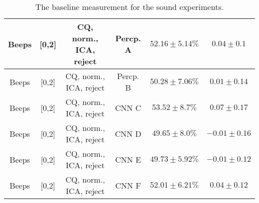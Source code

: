 \begin{table}[!htb]
{\begin{tabular}{c|c|c|c|c|c}
    \hline
    Beeps               & [0,2]                                         & CQ, norm., ICA, reject     & Percp. A              &  $52.16 \pm 5.14\%$   & $0.04 \pm 0.1$\\   
    \hline
    Beeps               & [0,2]                                         & CQ, norm., ICA, reject     & Percp. B              &  $50.28 \pm 7.06\%$   & $0.01 \pm 0.14$\\  
    \hline
    Beeps               & [0,2]                                         & CQ, norm., ICA, reject     & CNN C                 &  $53.52 \pm 8.7\%$    & $0.07 \pm 0.17$\\  
    \hline
    Beeps               & [0,2]                                         & CQ, norm., ICA, reject     & CNN D                 &  $49.65 \pm 8.0\%$    & $-0.01 \pm 0.16$\\  
    \hline
    Beeps               & [0,2]                                         & CQ, norm., ICA, reject     & CNN E                 &  $49.73 \pm 5.92\%$   & $-0.01 \pm 0.12$\\  
    \hline
    Beeps               & [0,2]                                         & CQ, norm., ICA, reject     & CNN F                 &  $52.01 \pm 6.21\%$   & $0.04 \pm 0.12$\\   
    \hline
\end{tabular}
}
\caption{The baseline measurement for the sound experiments.}
\label{tab:sound-baseline+reject-app}
\end{table}


